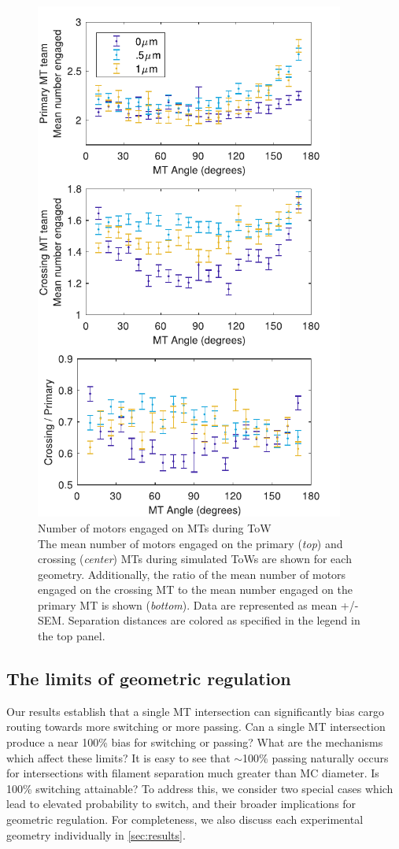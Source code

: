 \begin{figure}
\centering
\includegraphics[width=4in]{num_engagedEXP.pdf}
\caption[Number of motors engaged on MTs during ToW]{ Number of motors engaged on MTs during ToW\\
The mean number of motors engaged on the primary (\textit{top}) and crossing (\textit{center}) MTs during simulated ToWs are shown for each geometry. Additionally, the ratio of the mean number of motors engaged on the crossing MT to the mean number engaged on the primary MT is shown (\textit{bottom}). Data are represented as mean +/- SEM. Separation distances are colored as specified in the legend in the top panel.
} \label{fig:num_engagedEXP}
\end{figure}

\subsection{The limits of geometric regulation}

Our results establish that a single MT intersection can significantly bias cargo routing towards more switching or more passing. Can a single MT intersection produce a near 100\% bias for switching or passing? What are the mechanisms which affect these limits? It is easy to see that $\sim$100\% passing naturally occurs for intersections with filament separation much greater than MC diameter. Is 100\% switching attainable? To address this, we consider two special cases which lead to elevated probability to switch, and their broader implications for geometric regulation. For completeness, we also discuss each experimental geometry individually in \ref{sec:results}.

